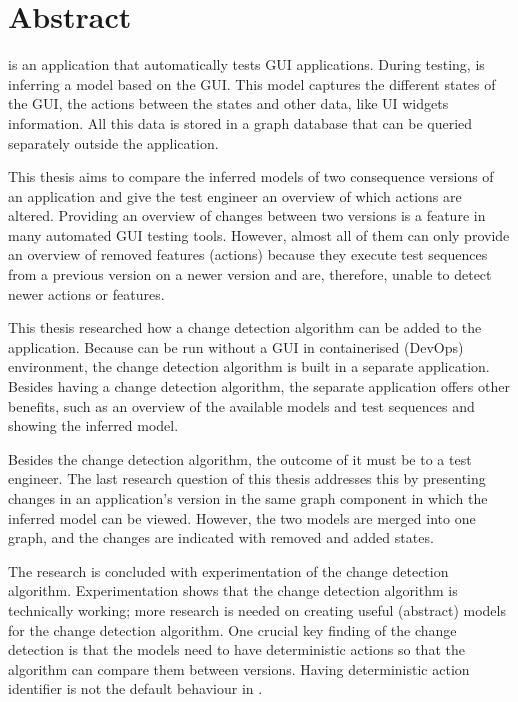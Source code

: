 \chapter*{Abstract}

\testar is an application that automatically tests GUI applications. During testing, \testar is inferring a model based on the GUI. This model captures the different states of the GUI, the actions between the states and other data, like UI widgets information. All this data is stored in a graph database that can be queried separately outside the \testar application. 

This thesis aims to compare the inferred models of two consequence versions of an application and give the test engineer an overview of which actions are altered. Providing an overview of changes between two versions is a feature in many automated GUI testing tools. However, almost all of them can only provide an overview of removed features (actions) because they execute test sequences from a previous version on a newer version and are, therefore, unable to detect newer actions or features. 

This thesis researched how a change detection algorithm can be added to the \testar application. Because \testar can be run without a GUI in containerised (DevOps) environment, the change detection algorithm is built in a separate application. Besides having a change detection algorithm, the separate application offers other benefits, such as an overview of the available models and test sequences and showing the inferred model.

Besides the change detection algorithm, the outcome of it must be to a test engineer. The last research question of this thesis addresses this by presenting changes in an application's version in the same graph component in which the inferred model can be viewed. However, the two models are merged into one graph, and the changes are indicated with removed and added states.  

The research is concluded with experimentation of the change detection algorithm. Experimentation shows that the change detection algorithm is technically working; more research is needed on creating useful (abstract) models for the change detection algorithm. One crucial key finding of the change detection is that the models need to have deterministic actions so that the algorithm can compare them between versions. Having deterministic action identifier is not the default behaviour in \testar. 
